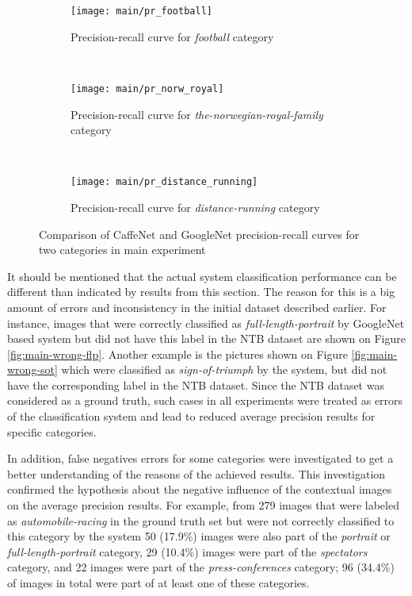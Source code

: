     \begin{figure}[h!]
        \centering
        \begin{subfigure}[a]{0.8\textwidth}
            \texttt{[image: main/pr\_football]}
            \caption{Precision-recall curve for \textit{football} category}
            \label{fig:main-pr-football}
        \end{subfigure}
        \\
        \begin{subfigure}[a]{0.8\textwidth}
            \texttt{[image: main/pr\_norw\_royal]}
            \caption{Precision-recall curve for \textit{the-norwegian-royal-family} category}
            \label{fig:main-pr-royal}
        \end{subfigure}
        \\
        \begin{subfigure}[a]{0.8\textwidth}
            \texttt{[image: main/pr\_distance\_running]}
            \caption{Precision-recall curve for \textit{distance-running} category}
            \label{fig:main-pr-distance-running}
        \end{subfigure}
        \caption[Main experiment. Precision-recall curves CaffeNet vs GoogleNet]{Comparison of CaffeNet and GoogleNet precision-recall curves for two categories in main experiment}
        \label{main-pr}
    \end{figure}
    
    It should be mentioned that the actual system classification performance can be different than indicated by results from this section. The reason for this is a big amount of errors and inconsistency in the initial dataset described earlier. For instance, images that were correctly classified as \textit{full-length-portrait} by GoogleNet based system but did not have this label in the NTB dataset are shown on Figure \ref{fig:main-wrong-flp}. Another example is the pictures shown on Figure \ref{fig:main-wrong-sot} which were classified as \textit{sign-of-triumph} by the system, but did not have the corresponding label in the NTB dataset. Since the NTB dataset was considered as a ground truth, such cases in all experiments were treated as errors of the classification system and lead to reduced average precision results for specific categories.

    In addition, false negatives errors for some categories were investigated to get a better understanding of the reasons of the achieved results. This investigation confirmed the hypothesis about the negative influence of the contextual images on the average precision results. For example, from 279 images that were labeled as \textit{automobile-racing} in the ground truth set but were not correctly classified to this category by the system 50 (17.9\%) images were also part of the \textit{portrait} or \textit{full-length-portrait} category, 29 (10.4\%) images were part of the \textit{spectators} category, and 22 images were part of the \textit{press-conferences} category; 96 (34.4\%) of images in total were part of at least one of these categories.
    
